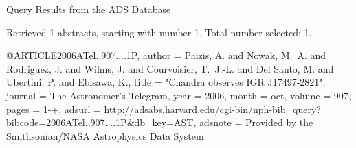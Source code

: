 Query Results from the ADS Database


Retrieved 1 abstracts, starting with number 1.  Total number selected: 1.

@ARTICLE{2006ATel..907....1P,
   author = {{Paizis}, A. and {Nowak}, M.~A. and {Rodriguez}, J. and {Wilms}, J. and 
	{Courvoisier}, T.~J.-L. and {Del Santo}, M. and {Ubertini}, P. and 
	{Ebisawa}, K.},
    title = "{Chandra observes IGR J17497-2821}",
  journal = {The Astronomer's Telegram},
     year = 2006,
    month = oct,
   volume = 907,
    pages = {1-+},
   adsurl = {http://adsabs.harvard.edu/cgi-bin/nph-bib_query?bibcode=2006ATel..907....1P&db_key=AST},
  adsnote = {Provided by the Smithsonian/NASA Astrophysics Data System}
}


